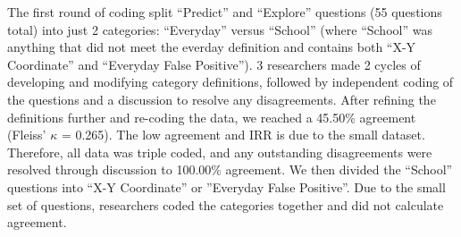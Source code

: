 \documentclass[sigconf,manuscript,review,anonymous]{acmart} %
\begin{document}
The first round of coding split ``Predict'' and ``Explore'' questions (55 questions total) into just 2 categories: ``Everyday'' versus ``School'' (where ``School'' was anything that did not meet the everday definition and contains both ``X-Y Coordinate'' and ``Everyday False Positive''). 3 researchers made 2 cycles of developing and modifying category definitions, followed by independent coding of the questions and a discussion to resolve any disagreements. After refining the definitions further and re-coding the data, we reached a 45.50\% agreement (Fleiss' \begin{math}\kappa\end{math} = 0.265). The low agreement and IRR is due to the small dataset. Therefore, all data was triple coded, and any outstanding disagreements were resolved through discussion to 100.00\% agreement. We then divided the ``School'' questions into ``X-Y Coordinate'' or ''Everyday False Positive''. Due to the small set of questions, researchers coded the categories together and did not calculate agreement.


\end{document}
